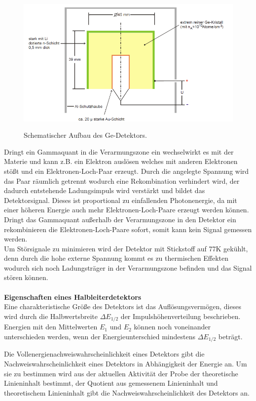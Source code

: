 \begin{figure}
  \centering
  \includegraphics[height=7cm]{Aufbau.png}
  \caption{Schematischer Aufbau des Ge-Detektors. \cite{skript}}
  \label{fig:Aufbau}
\end{figure}

Dringt ein Gammaquant in die Verarmungszone ein wechselwirkt es mit der Materie und kann
z.B. ein Elektron auslösen welches mit anderen Elektronen stößt und ein Elektronen-Loch-Paar erzeugt.
Durch die angelegte Spannung wird das Paar räumlich getrennt wodurch eine Rekombination verhindert wird,
der dadurch entstehende Ladungsimpuls
wird verstärkt und bildet das Detektorsignal. Dieses ist proportional zu einfallenden Photonenergie, da mit
einer höheren Energie auch mehr Elektronen-Loch-Paare erzeugt werden können.
Dringt das Gammaquant außerhalb der Verarmungszone in den Detektor ein rekombinieren die
Elektronen-Loch-Paare sofort, somit kann kein Signal gemessen werden.\\
Um Störsignale zu minimieren wird der Detektor mit Stickstoff auf 77\;K gekühlt, denn durch die
hohe externe Spannung kommt es zu thermischen Effekten wodurch sich noch Ladungsträger in der Verarmungszone
befinden und das Signal stören können.
\\
\\
\textbf{Eigenschaften eines Halbleiterdetektors}\\
Eine charakteristische Größe des Detektors ist das Auflösungsvermögen, dieses wird durch die
Halbwertsbreite $\Delta E_{1/2}$ der Impulshöhenverteilung beschrieben. Energien mit den Mittelwerten
$E_1$ und $E_2$ können noch voneinander unterschieden werden, wenn der Energieunterschied mindestens
$\Delta E_{1/2}$ beträgt.

Die Vollenergienachweiswahrscheinlichkeit eines Detektors gibt die Nachweiswahrscheinlichkeit eines Detektors
in Abhängigkeit der Energie an. Um sie zu bestimmen wird aus der aktuellen Aktivität der Probe der
theoretische Linieninhalt bestimmt, der Quotient aus gemessenem Linieninhalt und theoretischem
Linieninhalt gibt die Nachweiswahrscheinlichkeit des Detektors an.

